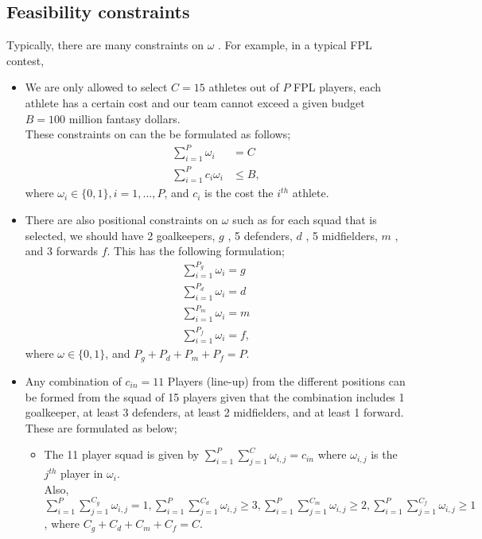 \documentclass[12pt,oneside,a4paper]{book}
\theoremstyle{definition}
\theoremstyle{remark}
\begin{document}
				\subsection{Feasibility constraints}
					Typically, there are many constraints on $\omega$ . For example, in a typical FPL contest,
					\begin{itemize}
						\item We are only allowed to select $C = 15$ athletes out of $P$ FPL players, each athlete has a certain cost and our team cannot exceed a given budget $B=100$ million fantasy dollars.\\
						These constraints on  can the be formulated as follows;
						\[
						\begin{aligned}
							\sum_{i=1}^{P}\omega_i &=C\\
							\sum_{i=1}^{P}c_i\omega_{i} &\le B,
						\end{aligned}
						\]
						where $\omega_{i} \in \{0,1\}, i = 1, ..., P$, and $c_i$ is the cost the $i^{th}$ athlete.
						\item There are also positional constraints on $\omega$ such as for each squad that is selected, we should have 2 goalkeepers, $g$ , 5 defenders, $d$ , 5 midfielders, $m$ , and 3 forwards $f$. This has the following formulation;
						\[
						\begin{aligned}
							\sum_{i=1}^{P_g}\omega_{i} =g\\
							\sum_{i=1}^{P_d}\omega_{i} =d\\
							\sum_{i=1}^{P_m}\omega_{i} =m\\
							\sum_{i=1}^{P_f}\omega_{i} =f,
						\end{aligned}
						\]
						where $\omega \in \{0,1\}$, and $P_g+P_d+P_m+P_f=P$.
						\item Any combination of $c_{in}=11$ Players (line-up) from the different positions can be formed from the squad of 15 players given that the combination includes 1 goalkeeper, at least 3 defenders, at least 2 midfielders, and at least 1 forward. These are formulated as below;
						\begin{itemize}
							\item The 11 player squad is given by $\sum_{i=1}^{P}\sum_{j=1}^{C}\omega_{i,j} = c_{in}$ where $\omega_{i,j}$ is the $j^{th}$ player in $\omega_{i}$.\\
							Also, $\sum_{i=1}^{P}\sum_{j=1}^{C_g}\omega_{i,j} = 1, \sum_{i=1}^{P}\sum_{j=1}^{C_d}\omega_{i,j} \ge 3, \sum_{i=1}^{P}\sum_{j=1}^{C_m}\omega_{i,j} \ge 2, \sum_{i=1}^{P}\sum_{j=1}^{C_f}\omega_{i,j} \ge 1$, where $C_g+C_d+C_m+C_f = C$.
						\end{itemize}

					\end{itemize}
\end{document}
